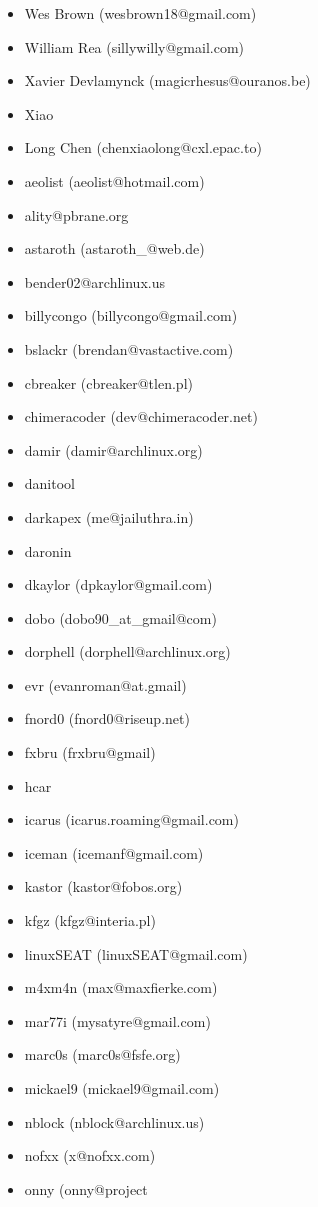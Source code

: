 \begin{latin}
\begin{itemize}
\item  Wes Brown (wesbrown18@gmail.com)
\item  William Rea (sillywilly@gmail.com)
\item  Xavier Devlamynck (magicrhesus@ouranos.be)
\item  Xiao\item Long Chen (chenxiaolong@cxl.epac.to)
\item  aeolist (aeolist@hotmail.com)
\item  ality@pbrane.org
\item  astaroth (astaroth\_@web.de)
\item  bender02@archlinux.us
\item  billycongo (billycongo@gmail.com)
\item  bslackr (brendan@vastactive.com)
\item  cbreaker (cbreaker@tlen.pl)
\item  chimeracoder (dev@chimeracoder.net)
\item  damir (damir@archlinux.org)
\item  danitool
\item  darkapex (me@jailuthra.in)
\item  daronin
\item  dkaylor (dpkaylor@gmail.com)
\item  dobo (dobo90\_at\_gmail@com)
\item  dorphell (dorphell@archlinux.org)
\item  evr (evanroman@at.gmail)
\item  fnord0 (fnord0@riseup.net)
\item  fxbru (frxbru@gmail)
\item  hcar
\item  icarus (icarus.roaming@gmail.com)
\item  iceman (icemanf@gmail.com)
\item  kastor (kastor@fobos.org)
\item  kfgz (kfgz@interia.pl)
\item  linuxSEAT (linuxSEAT@gmail.com)
\item  m4xm4n (max@maxfierke.com)
\item  mar77i (mysatyre@gmail.com)
\item  marc0s (marc0s@fsfe.org)
\item  mickael9 (mickael9@gmail.com)
\item  nblock (nblock@archlinux.us)
\item  nofxx (x@nofxx.com)
\item  onny (onny@project

\end{itemize}
\end{latin}
